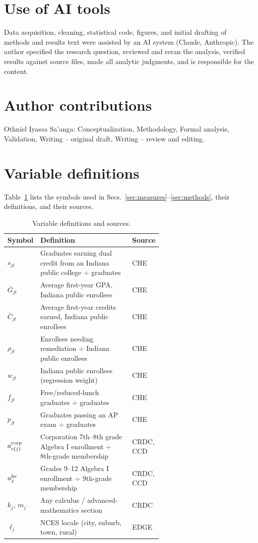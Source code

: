 \documentclass[aps,prd,reprint,superscriptaddress,nofootinbib,floatfix]{revtex4-2}
\begin{document}
\section*{Use of AI tools}
Data acquisition, cleaning, statistical code, figures, and initial drafting of methods and results text were assisted by an AI system (Claude, Anthropic). The author specified the research question, reviewed and reran the analysis, verified results against source files, made all analytic judgments, and is responsible for the content.

\section*{Author contributions}
Othniel Iyassa Sa'anga: Conceptualization, Methodology, Formal analysis, Validation, Writing -- original draft, Writing -- review and editing.

\appendix

\section{Variable definitions}\label{app:vars}

Table~\ref{tab:vars} lists the symbols used in Secs.~\ref{sec:measures}--\ref{sec:methods}, their definitions, and their sources.

\begin{table}[t]
\caption{Variable definitions and sources.}
\label{tab:vars}
\footnotesize
\begin{tabular}{lp{0.62\linewidth}l}
\hline\hline
Symbol & Definition & Source \\
\hline
$s_{jt}$ & Graduates earning dual credit from an Indiana public college $\div$ graduates & CHE \\
$\bar G_{jt}$ & Average first-year GPA, Indiana public enrollees & CHE \\
$\bar C_{jt}$ & Average first-year credits earned, Indiana public enrollees & CHE \\
$\rho_{jt}$ & Enrollees needing remediation $\div$ Indiana public enrollees & CHE \\
$w_{jt}$ & Indiana public enrollees (regression weight) & CHE \\
$f_{jt}$ & Free/reduced-lunch graduates $\div$ graduates & CHE \\
$p_{jt}$ & Graduates passing an AP exam $\div$ graduates & CHE \\
$a^{\rm corp}_{c(j)}$ & Corporation 7th--8th grade Algebra I enrollment $\div$ 8th-grade membership & CRDC, CCD \\
$a^{\rm hs}_{j}$ & Grades 9--12 Algebra I enrollment $\div$ 9th-grade membership & CRDC, CCD \\
$k_j$, $m_j$ & Any calculus / advanced-mathematics section & CRDC \\
$\ell_j$ & NCES locale (city, suburb, town, rural) & EDGE \\
\hline\hline
\end{tabular}
\end{table}
\end{document}
